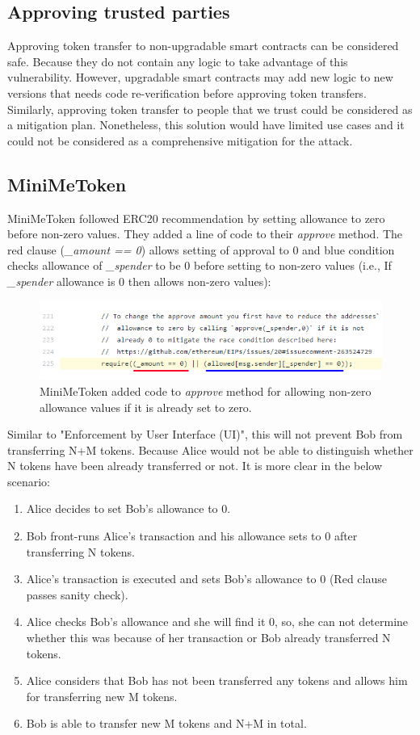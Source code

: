 \subsection{Approving trusted parties}
Approving token transfer to non-upgradable smart contracts can be considered safe. Because they do not contain any logic to take advantage of this vulnerability. However, upgradable smart contracts may add new logic to new versions that needs code re-verification before approving token transfers. Similarly, approving token transfer to people that we trust could be considered as a mitigation plan. Nonetheless, this solution would have limited use cases and it could not be considered as a comprehensive mitigation for the attack.

\subsection{MiniMeToken}
MiniMeToken\cite{Ref15} followed ERC20 recommendation by setting allowance to zero before non-zero values. They added a line of code to their \textit{approve} method. The red clause (\textit{\_amount == 0}) allows setting of approval to 0 and blue condition checks allowance of \textit{\_spender} to be 0 before setting to non-zero values (i.e., If \textit{\_spender} allowance is 0 then allows non-zero values):
\begin{figure}[H]
	\centering
	\includegraphics[width=1.0\linewidth]{figures/multiple_withdrawal_06.png}
	\caption{MiniMeToken added code to \textit{approve} method for allowing non-zero allowance values if it is already set to zero.}
\end{figure}
\noindent Similar to "Enforcement by User Interface (UI)", this will not prevent Bob from transferring N+M tokens. Because Alice would not be able to distinguish whether N tokens have been already transferred or not. It is more clear in the below scenario:
\begin{enumerate}
	\item Alice decides to set Bob’s allowance to 0.
	\item Bob front-runs Alice’s transaction and his allowance sets to 0 after transferring N tokens.
	\item Alice’s transaction is executed and sets Bob’s allowance to 0 (Red clause passes sanity check).
	\item Alice checks Bob’s allowance and she will find it 0, so, she can not determine whether this was because of her transaction or Bob already transferred N tokens.
	\item Alice considers that Bob has not been transferred any tokens and allows him for transferring new M tokens.
	\item Bob is able to transfer new M tokens and N+M in total.
\end{enumerate}

